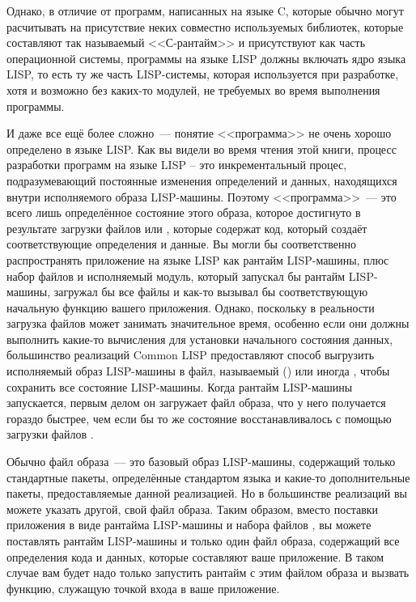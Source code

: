 Однако, в отличие от программ, написанных на языке C, которые обычно могут расчитывать на
присутствие неких совместно используемых библиотек, которые составляют так называемый
<<С-рантайм>> и присутствуют как часть операционной системы, программы на языке LISP
должны включать ядро языка LISP, то есть ту же часть LISP-системы, которая используется
при разработке, хотя и возможно без каких-то модулей, не требуемых во время выполнения
программы.

И даже все ещё более сложно~--- понятие <<программа>> не очень хорошо определено в языке
LISP. Как вы видели во время чтения этой книги, процесс разработки программ на языке LISP
-- это инкрементальный процес, подразумевающий постоянные изменения определений и данных,
находящихся внутри исполняемого образа LISP-машины. Поэтому <<программа>>~--- это всего
лишь определённое состояние этого образа, которое достигнуто в результате загрузки файлов
 или , которые содержат код, который создаёт соответствующие
определения и данные. Вы могли бы соответственно распространять приложение на языке LISP
как рантайм LISP-машины, плюс набор файлов  и исполняемый модуль, который
запускал бы рантайм LISP-машины, загружал бы все файлы  и как-то вызывал бы
соответствующую начальную функцию вашего приложения. Однако, поскольку в реальности
загрузка файлов  может занимать значительное время, особенно если они должны
выполнить какие-то вычисления для установки начального состояния данных, большинство
реализаций Common LISP предоставляют способ выгрузить исполняемый образ LISP-машины в
файл, называемый  () или иногда , чтобы
сохранить все состояние LISP-машины. Когда рантайм LISP-машины запускается, первым делом
он загружает файл образа, что у него получается гораздо быстрее, чем если бы то же
состояние восстанавливалось с помощью загрузки файлов .

Обычно файл образа~--- это базовый образ LISP-машины, содержащий только стандартные пакеты,
определённые стандартом языка и какие-то дополнительные пакеты, предоставляемые данной
реализацией. Но в большинстве реализаций вы можете указать другой, свой файл образа. Таким
образом, вместо поставки приложения в виде рантайма LISP-машины и набора файлов
, вы можете поставлять рантайм LISP-машины и только один файл образа,
содержащий все определения кода и данных, которые составляют ваше приложение. В таком
случае вам будет надо только запустить рантайм с этим файлом образа и вызвать функцию,
служащую точкой входа в ваше приложение.

